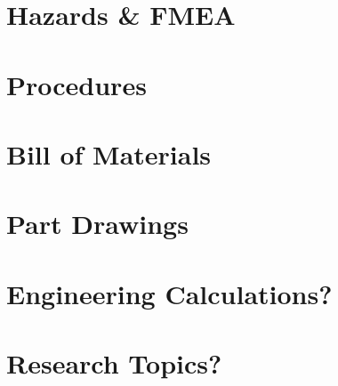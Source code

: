 \documentclass{report}
\begin{document}
    \begin{appendices}
        \makeatletter
        \makeatother
        
        \chapter{Hazards \& FMEA}
        \chapter{Procedures}
        \chapter{Bill of Materials}
        \chapter{Part Drawings}
        \chapter{Engineering Calculations?}
        \chapter{Research Topics?}
    \end{appendices}
    
    
\end{document}

